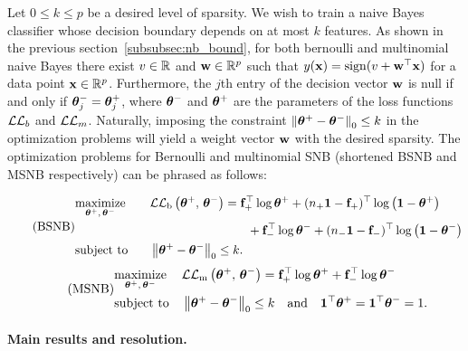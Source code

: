 Let $0 \leq k \leq p$ be a desired level of sparsity.
We wish to train a naive Bayes classifier whose decision boundary depends on at most $k$ features.
As shown in the previous section~\ref{subsubsec:nb_bound},
for both bernoulli and multinomial naive Bayes
there exist $v \in \mathbb{R}$ and $\mathbf{w} \in \mathbb{R}^p$ such that $y(\mathbf{x}) = \operatorname*{sign}(v + \mathbf{w}^\top\mathbf{x})$ for a data point $\mathbf{x}\in\mathbb{R}^p$.
Furthermore, the $j$th entry of the decision vector $\mathbf{w}$ is null if and only if $\bm{\theta}^-_j = \bm{\theta}^+_j$,
where $\bm{\theta}^-$ and $\bm{\theta}^+$ are the parameters of the loss functions $\mathcal{L}\mathcal{L}_b$ and $\mathcal{L}\mathcal{L}_m$.
Naturally, imposing the constraint $\left\lVert\bm{\theta}^+ - \bm{\theta}^-\right\rVert_0 \leq k$ in the optimization problems
will yield a weight vector $\mathbf{w}$ with the desired sparsity.
The optimization problems for Bernoulli and multinomial SNB
(shortened BSNB and MSNB respectively) can be phrased as follows:

\begin{equation}\label{eq:bsnb}\tag{BSNB}
\begin{aligned}
    & \underset{\bm{\theta}^+,\, \bm{\theta}^-}{\text{maximize}}
    \quad&&\mathcal{L}\mathcal{L}_\text{b}\left( \bm{\theta}^+,\, \bm{\theta}^- \right)
    = \mathbf{f}_+^\top\log\bm{\theta}^+ + (n_+\mathbf{1} - \mathbf{f}_+)^\top\log\left( \mathbf{1} - \bm{\theta}^+ \right)\\
    & && \qquad\qquad\qquad\qquad + \mathbf{f}_-^\top\log\bm{\theta}^- + (n_-\mathbf{1} - \mathbf{f}_-)^\top\log\left( \mathbf{1} - \bm{\theta}^- \right)\\
    & \text{subject to}
    &&\left\lVert\bm{\theta}^+ - \bm{\theta}^-\right\rVert_0 \leq k.
\end{aligned}
\end{equation}
\vspace{0.25cm}
\begin{equation}\label{eq:msnb}\tag{MSNB}
\begin{aligned}
    & \underset{\bm{\theta}^+,\, \bm{\theta}^-}{\text{maximize}}
    & & \mathcal{L}\mathcal{L}_\text{m}\left( \bm{\theta}^+,\, \bm{\theta}^- \right) = \mathbf{f}_+^\top\log\bm{\theta}^+ + \mathbf{f}_-^\top\log\bm{\theta}^-\\
    & \text{subject to}
    & & \left\lVert\bm{\theta}^+ - \bm{\theta}^-\right\rVert_0 \leq k
    \quad\text{and}\quad \mathbf{1}^\top\bm{\theta}^+ = \mathbf{1}^\top\bm{\theta}^- = 1.
\end{aligned}
\end{equation}

\paragraph{Main results and resolution.}\label{subsubsec:snb_th}

